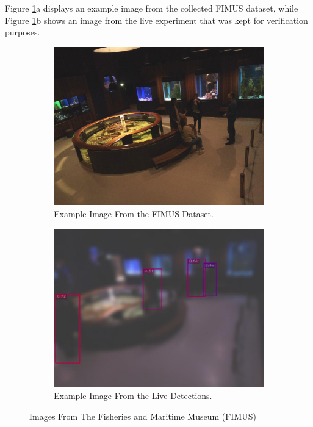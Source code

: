 Figure \ref{fig:example_from_aquarium}a displays an example image from the collected FIMUS dataset, while Figure \ref{fig:example_from_aquarium}b shows an image from the live experiment that was kept for verification purposes.
\begin{figure}[H]
    \centering
    \begin{subfigure}{0.475\textwidth}
        \centering
		\includegraphics[width=\textwidth]{Images/DeviceImages/2nd-iteration/example.jpg}
        \caption{Example Image From the FIMUS Dataset.}
    \end{subfigure}
    \hfill
    \begin{subfigure}{0.475\textwidth}
        \centering
        \includegraphics[width=\textwidth]{Images/DeviceImages/live-example.jpg}
        \caption{Example Image From the Live Detections.}
    \end{subfigure}
	\caption{Images From The Fisheries and Maritime Museum (FIMUS)}
	\label{fig:example_from_aquarium}
\end{figure}

